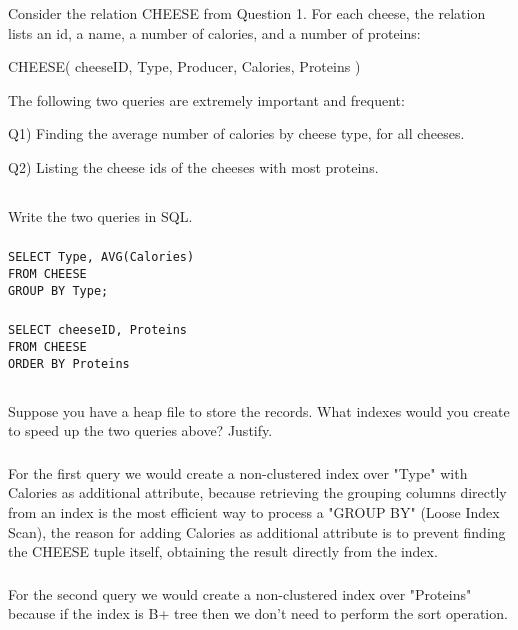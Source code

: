 {\color{gray}
Consider the relation CHEESE from Question 1. For each cheese, the relation lists an id, a name, a number of calories, and a number of proteins:

CHEESE( cheeseID, Type, Producer, Calories, Proteins )

The following two queries are extremely important and frequent:

Q1) Finding the average number of calories by cheese type, for all cheeses.

Q2) Listing the cheese ids of the cheeses with most proteins.
}


\subsection{}
{\color{gray}Write the two queries in SQL.}
\subsubsection{}
\begin{lstlisting}[frame=single]
SELECT Type, AVG(Calories)
FROM CHEESE
GROUP BY Type;
\end{lstlisting}

\subsubsection{}
\begin{lstlisting}[frame=single]
SELECT cheeseID, Proteins
FROM CHEESE
ORDER BY Proteins
\end{lstlisting}

\subsection{}
{\color{gray}Suppose you have a heap file to store the records. What indexes would you create to speed up the two queries above? Justify.}
\subsubsection{}
For the first query we would create a non-clustered index over "Type" with Calories as additional attribute, because retrieving the grouping columns directly from an index is the most efficient way to process a "GROUP BY" (Loose Index Scan), the reason for adding Calories as additional attribute is to prevent finding the CHEESE tuple itself, obtaining the result directly from the index. 
\subsubsection{}
For the second query we would create a non-clustered index over "Proteins" because if the index is B+ tree then we don't need to perform the sort operation.
